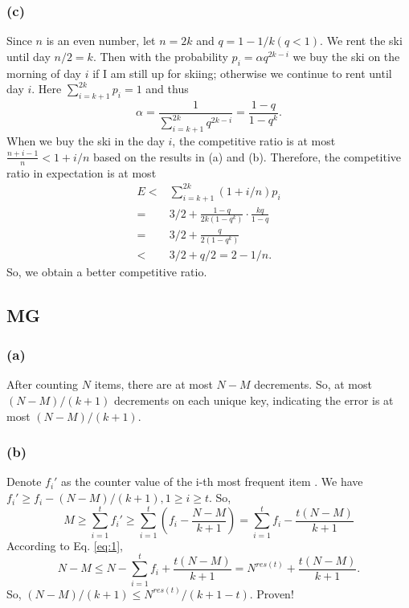 \documentclass[12pt,onecolumn,a4paper]{article}
\begin{document}
\subsubsection*{(c)}
Since $n$ is an even number, let $n=2k$ and $q=1-1/k (q<1)$. We rent the ski until day $n/2=k$. Then with the probability $p_i=\alpha q^{2k-i}$ we buy the ski on the morning of day $i$ if I am still up for skiing; otherwise we continue to rent until day $i$.
Here $\sum_{i=k+1}^{2k} p_i=1$ and thus 
\begin{equation*}
	\alpha=\frac{1}{\sum_{i=k+1}^{2k} q^{2k-i}}=\frac{1-q}{1-q^k}.
\end{equation*}
When we buy the ski in the day $i$, the competitive ratio is at most $\frac{n+i-1}{n}<1+i/n$ based on the results in (a) and (b). Therefore, the competitive ratio in expectation is at most
\begin{equation*}
	\begin{split}
		E<&\sum_{i=k+1}^{2k} (1+i/n)p_i\\
		=&3/2+\frac{1-q}{2k(1-q^k)}\cdot\frac{kq}{1-q}\\
		=&3/2+\frac{q}{2(1-q^k)}\\
		<&3/2+q/2=2-1/n.
	\end{split}
\end{equation*}
So, we obtain a better competitive ratio.
\subsection*{MG}
\subsubsection*{(a)}
After counting $N$ items, there are at most  $N-M$ decrements. So, at most $(N-M)/(k+1)$ decrements on each unique key, indicating the error is at most $(N-M)/(k+1)$.
\subsubsection*{(b)}
Denote $f_i'$ as the counter value of the i-th most frequent item . We have $f_i'\ge f_i-(N-M)/(k+1),1\ge i\ge t$. So,
\begin{equation}\label{eq:1}
	M\ge \sum_{i=1}^{t} f_i'\ge \sum_{i=1}^{t} (f_i-\frac{N-M}{k+1})=\sum_{i=1}^{t} f_i-\frac{t(N-M)}{k+1}
\end{equation}
According to Eq. \ref{eq:1},
\begin{equation}\label{eq:2}
	N-M\le N-\sum_{i=1}^{t} f_i+\frac{t(N-M)}{k+1}=N^{res(t)}+\frac{t(N-M)}{k+1}.
\end{equation}
So, $(N-M)/(k+1)\le N^{res(t)}/(k+1-t)$. Proven!
\end{document}
